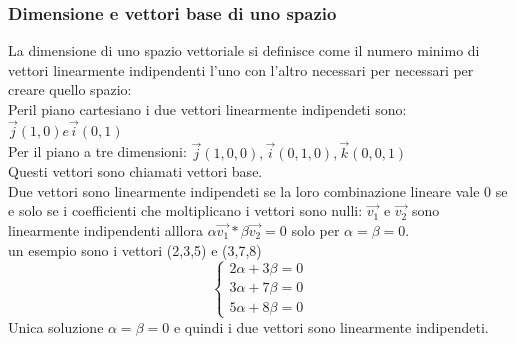 \documentclass[a4paper]{article}
\begin{document}
\subsubsection{Dimensione e vettori base di uno spazio}
La dimensione di uno spazio vettoriale si definisce come il numero minimo di vettori linearmente indipendenti l'uno con l'altro necessari per necessari per creare quello spazio:
\\ Peril piano cartesiano i due vettori linearmente indipendeti sono: $\vec{j}(1,0) e \vec{i}(0,1) $
\\ Per il piano a tre dimensioni: $ \vec{j}(1,0,0), \vec{i}(0,1,0), \vec{k}(0,0,1) $
\\ Questi vettori sono chiamati vettori base.
\\Due vettori sono linearmente indipendeti se la loro combinazione lineare vale 0 se e solo se i coefficienti che moltiplicano i vettori sono nulli:
$\vec{v_{1}}$ e $\vec{v_{2}} $ sono linearmente indipendenti alllora $\alpha\vec{v_{1}}*\beta\vec{v_{2}}=0$ solo per $\alpha=\beta=0 $.
\\ un esempio sono i vettori (2,3,5) e (3,7,8) \\
\[\begin{cases}
2\alpha + 3\beta=0\\
3\alpha + 7\beta=0\\
5\alpha + 8\beta=0
\end{cases}
\]
Unica soluzione $\alpha=\beta=0$ e quindi i due vettori sono linearmente indipendeti.
\\
\end{document}

